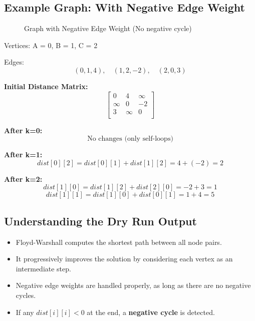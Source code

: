 \documentclass[14pt,a4paper]{extarticle}
\begin{document}
\subsection{Example Graph: With Negative Edge Weight}
\begin{figure}[H]
\centering
{}
\caption{Graph with Negative Edge Weight (No negative cycle)}
\end{figure}

Vertices: A = 0, B = 1, C = 2

Edges:
\[
(0, 1, 4),\quad (1, 2, -2),\quad (2, 0, 3)
\]

\newpage
\textbf{Initial Distance Matrix:}
\[
\begin{bmatrix}
0 & 4 & \infty \\
\infty & 0 & -2 \\
3 & \infty & 0 \\
\end{bmatrix}
\]

\textbf{After k=0:}
\[
\text{No changes (only self-loops)}
\]

\textbf{After k=1:}
\[
dist[0][2] = dist[0][1] + dist[1][2] = 4 + (-2) = 2
\]

\textbf{After k=2:}
\[
dist[1][0] = dist[1][2] + dist[2][0] = -2 + 3 = 1
\]
\[
dist[1][1] = dist[1][0] + dist[0][1] = 1 + 4 = 5
\]

\subsection{Understanding the Dry Run Output}

\begin{itemize}[leftmargin=1.5em]
    \item Floyd-Warshall computes the shortest path between all node pairs.
    \item It progressively improves the solution by considering each vertex as an intermediate step.
    \item Negative edge weights are handled properly, as long as there are no negative cycles.
    \item If any $dist[i][i] < 0$ at the end, a \textbf{negative cycle} is detected.
\end{itemize}
\end{document}
